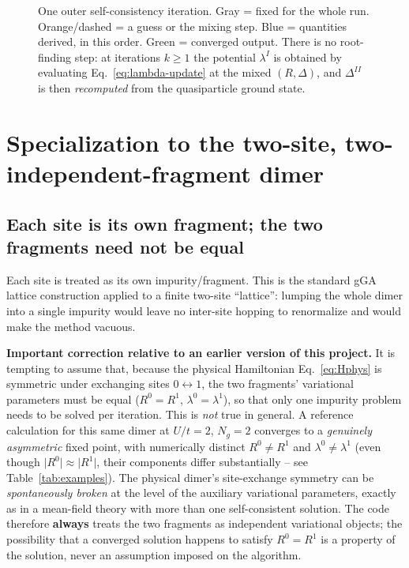 \documentclass[11pt]{article}
\newcommand{\Ng}{N_{g}}
\begin{document}
\begin{figure}[H]
\caption{One outer self-consistency iteration. Gray = fixed for the whole
run. Orange/dashed = a guess or the mixing step. Blue = quantities derived,
in this order. Green = converged output. There is no root-finding step: at
iterations $k\ge1$ the potential $\lambda^I$ is obtained by evaluating
Eq.~\eqref{eq:lambda-update} at the mixed $(R,\Delta)$, and $\Delta^{II}$ is
then \emph{recomputed} from the quasiparticle ground state.}
\label{fig:workflow}
\end{figure}

\section{Specialization to the two-site, two-independent-fragment dimer}
\label{sec:two-fragment}

\subsection{Each site is its own fragment; the two fragments need not be equal}

Each site is treated as its own impurity/fragment. This is the standard gGA
lattice construction applied to a finite two-site ``lattice'': lumping the
whole dimer into a single impurity would leave no inter-site hopping to
renormalize and would make the method vacuous.

\textbf{Important correction relative to an earlier version of this project.}
It is tempting to assume that, because the physical Hamiltonian
Eq.~\eqref{eq:Hphys} is symmetric under exchanging sites $0\leftrightarrow1$,
the two fragments' variational parameters must be equal
($R^0=R^1$, $\lambda^0=\lambda^1$), so that only one impurity problem needs to
be solved per iteration. This is \emph{not} true in general. A reference
calculation for this same dimer at $U/t=2$, $\Ng=2$ converges to a
\emph{genuinely asymmetric} fixed point, with numerically distinct $R^0\neq
R^1$ and $\lambda^0\neq\lambda^1$ (even though $\lvert R^0\rvert\approx\lvert
R^1\rvert$, their components differ substantially -- see
Table~\ref{tab:examples}). The physical dimer's site-exchange symmetry can be
\emph{spontaneously broken} at the level of the auxiliary variational
parameters, exactly as in a mean-field theory with more than one
self-consistent solution. The code therefore \textbf{always} treats the two
fragments as independent variational objects; the possibility that a
converged solution happens to satisfy $R^0=R^1$ is a property of the
solution, never an assumption imposed on the algorithm.
\end{document}
